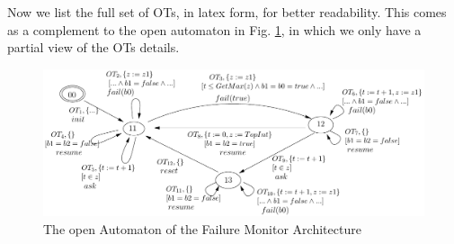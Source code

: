 \documentclass{llncs}
\begin{document}






Now we list the full set of OTs, in latex form, for better
readability. This comes as a complement to the open automaton in
Fig. \ref{schema:ArchFailure:OA}, in which we only have a partial view
of the OTs details.

\begin{figure}[t]
  \centering
  \includegraphics[width=\columnwidth]{TimerOAFullDetailed}
  \caption{The open Automaton of the Failure Monitor Architecture}
  \label{schema:ArchFailure:OA}
\end{figure}
\end{document}
